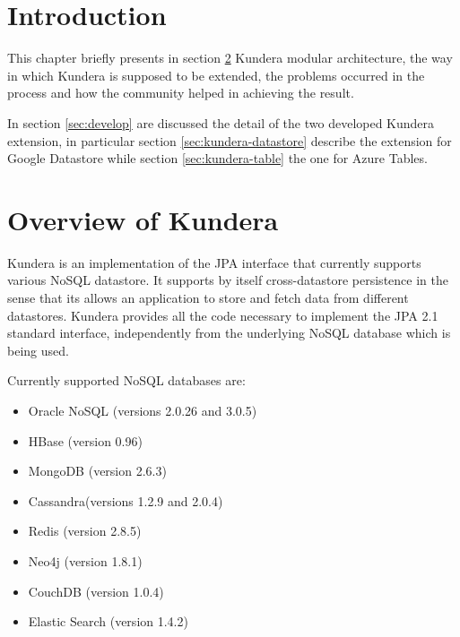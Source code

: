 \section{Introduction}
This chapter briefly presents in section \ref{sec:kundera} Kundera modular architecture, the way in which Kundera is supposed to be extended, the problems occurred in the process and how the community helped in achieving the result.

\noindent In section \ref{sec:develop} are discussed the detail of the two developed Kundera extension, in particular section \ref{sec:kundera-datastore} describe the extension for Google Datastore while section \ref{sec:kundera-table} the one for Azure Tables.

\section{Overview of Kundera}
\label{sec:kundera}
Kundera \cite{online:kundera} is an implementation of the JPA interface that currently supports various NoSQL datastore. It supports by itself cross-datastore persistence in the sense that its allows an application to store and fetch data from different datastores.
Kundera provides all the code necessary to implement the JPA 2.1 standard interface, independently from the underlying NoSQL database which is being used.

\newparagraph Currently supported NoSQL databases are:
\begin{itemize}
\item Oracle NoSQL (versions 2.0.26 and 3.0.5)
\item HBase (version 0.96)
\item MongoDB (version 2.6.3)
\item Cassandra(versions 1.2.9 and 2.0.4)
\item Redis (version 2.8.5)
\item Neo4j (version 1.8.1)
\item CouchDB (version 1.0.4)
\item Elastic Search (version 1.4.2)
\end{itemize}

